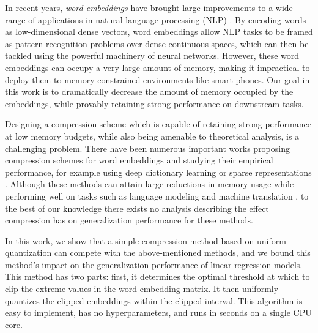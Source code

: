 In recent years, \textit{word embeddings} \citep{word2vec13,glove14,fasttext18} have brought large improvements to a wide range of applications in natural language processing (NLP) \citep{collins16,drqa17}.
By encoding words as low-dimensional dense vectors, word embeddings allow NLP tasks to be framed as pattern recognition problems over dense continuous spaces, which can then be tackled using the powerful machinery of neural networks.
However, these word embeddings can occupy a very large amount of memory, making it impractical to deploy them to memory-constrained environments like smart phones.
Our goal in this work is to dramatically decrease the amount of memory occupied by the embeddings, while provably retaining strong performance on downstream tasks.

Designing a compression scheme which is capable of retaining strong performance at low memory budgets, while also being amenable to theoretical analysis, is a challenging problem.
There have been numerous important works proposing compression schemes for word embeddings and studying their empirical performance, for example using deep dictionary learning or sparse representations \citep{sparse16,andrews16,dccl17}.
Although these methods can attain large reductions in memory usage while performing well on tasks such as language modeling \citep{mikolov10} and machine translation \citep{bahdanau15}, to the best of our knowledge there exists no analysis describing the effect compression has on generalization performance for these methods.


In this work, we show that a simple compression method based on uniform quantization can compete with the above-mentioned methods, and we bound this method's impact on the generalization performance of linear regression models.
This method has two parts: first, it determines the optimal threshold at which to clip the extreme values in the word embedding matrix.
It then uniformly quantizes the clipped embeddings within the clipped interval.
This algorithm is easy to implement, has no hyperparameters, and runs in seconds on a single CPU core.

